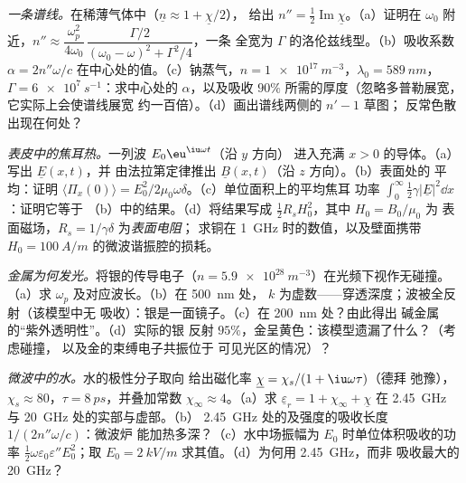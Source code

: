 \begin{exercise}[$\star\star$]\label{exo:b2:waves-in-media:9}
\emph{一条谱线。}在稀薄气体中（$\underline n \approx 1 + \underline\chi/2$），
给出 $n'' = \tfrac12\operatorname{Im}\underline\chi$。（a）证明在
$\omega_0$ 附近，$n'' \approx \dfrac{\omega_p^2}{4\omega_0}\,\dfrac{\Gamma/2}{(\omega_0 - \omega)^2 + \Gamma^2/4}$，一条
全宽为 $\Gamma$ 的洛伦兹线型。（b）吸收系数 $\alpha = 2n''\omega/c$
在中心处的值。（c）钠蒸气，$n = \qty{1e17}{m^{-3}}$，$\lambda_0 = \qty{589}{nm}$，
$\Gamma = \qty{6e7}{s^{-1}}$：求中心处的 $\alpha$，以及吸收
$90\%$ 所需的厚度（忽略多普勒展宽，它实际上会使谱线展宽
约一百倍）。（d）画出谱线两侧的 $n' - 1$ 草图；
反常色散出现在何处？
\end{exercise}

\begin{exercise}[$\star\star\star$]\label{exo:b2:waves-in-media:10}
\emph{表皮中的焦耳热。}一列波 $E_0\eu^{\iu\omega t}$（沿 $y$ 方向）
进入充满 $x > 0$ 的导体。（a）写出 $\underline E(x, t)$，并
由法拉第定律推出 $\underline B(x, t)$（沿 $z$ 方向）。（b）表面处的
平均：证明 $\langle\Pi_x(0)\rangle = E_0^2/2\mu_0\omega\delta$。（c）单位面积上的平均焦耳
功率 $\int_0^\infty\tfrac12\gamma|\underline E|^2\dd x$：证明它等于
（b）中的结果。（d）将结果写成 $\tfrac12R_sH_0^2$，其中 $H_0 = B_0/\mu_0$ 为
表面磁场，$R_s = 1/\gamma\delta$ 为\emph{表面电阻}；
求铜在 \qty{1}{GHz} 时的数值，以及壁面携带
$H_0 = \qty{100}{A/m}$ 的微波谐振腔的损耗。
\end{exercise}

\begin{exercise}[$\star\star\star$]\label{exo:b2:waves-in-media:11}
\emph{金属为何发光。}将银的传导电子（$n =
\qty{5.9e28}{m^{-3}}$）在光频下视作无碰撞。
（a）求 $\omega_p$ 及对应波长。（b）在 \qty{500}{nm} 处，
$k$ 为虚数——穿透深度；波被全反射（该模型中无
吸收）：银是一面镜子。（c）在 \qty{200}{nm} 处？由此得出
碱金属的“紫外透明性”。（d）实际的银
反射 $95\%$，金呈黄色：该模型遗漏了什么？（考虑碰撞，
以及金的束缚电子共振位于
可见光区的情况）？
\end{exercise}

\begin{exercise}[$\star\star\star$]\label{exo:b2:waves-in-media:12}
\emph{微波中的水。}水的极性分子取向
给出磁化率 $\underline\chi = \chi_s/(1 + \iu\omega\tau)$（德拜
弛豫），$\chi_s \approx 80$，$\tau = \qty{8}{ps}$，并叠加常数
$\chi_\infty \approx 4$。（a）求 $\underline\varepsilon_r = 1 + \chi_\infty
+ \underline\chi$ 在 \qty{2.45}{GHz} 与 \qty{20}{GHz} 处的实部与虚部。（b）
\qty{2.45}{GHz} 处的及强度的吸收长度 $1/(2n''\omega/c)$：微波炉
能加热多深？（c）水中场振幅为 $E_0$ 时单位体积吸收的功率
$\tfrac12\omega\varepsilon_0\varepsilon''E_0^2$；取
$E_0 = \qty{2}{kV/m}$ 求其值。（d）为何用 \qty{2.45}{GHz}，而非
吸收最大的 \qty{20}{GHz}？
\end{exercise}

